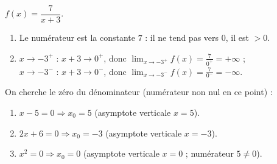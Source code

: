 \documentclass[11pt,a4paper]{article}
\begin{document}
\begin{correction}
$f(x)=\dfrac{7}{x+3}$.
\begin{enumerate}[label=\alph*),leftmargin=2em,itemsep=3pt]
  \item Le numérateur est la constante $7$ : il ne tend pas vers $0$, il est $>0$.
  \item $x\to -3^{+}$ : $x+3\to 0^{+}$, donc $\displaystyle\lim_{x\to -3^{+}} f(x)=\frac{7}{0^{+}}=+\infty$ ;\\
        $x\to -3^{-}$ : $x+3\to 0^{-}$, donc $\displaystyle\lim_{x\to -3^{-}} f(x)=\frac{7}{0^{-}}=-\infty$.
\end{enumerate}
\end{correction}

\begin{correction}
On cherche le zéro du dénominateur (numérateur non nul en ce point) :
\begin{enumerate}[label=\alph*),leftmargin=2em,itemsep=3pt]
  \item $x-5=0\Rightarrow x_0=5$ (asymptote verticale $x=5$).
  \item $2x+6=0\Rightarrow x_0=-3$ (asymptote verticale $x=-3$).
  \item $x^2=0\Rightarrow x_0=0$ (asymptote verticale $x=0$ ; numérateur $5\neq 0$).
\end{enumerate}
\end{correction}
\end{document}
